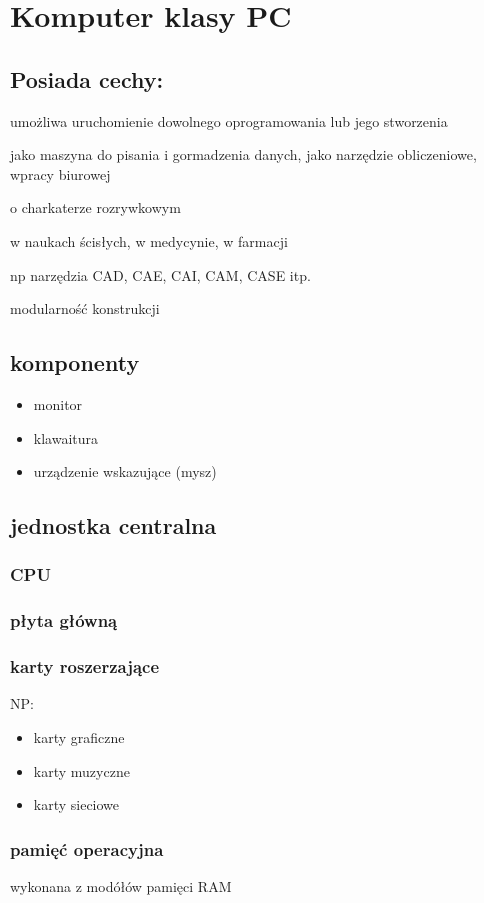 \documentclass[11pt]{article}
\begin{document}
\section{Komputer klasy PC}
\label{sec:org213ab8e}
\subsection{Posiada cechy:}
\label{sec:org7598b9a}
\begin{description}
\item[{porgramowalność}] umożliwa uruchomienie dowolnego oprogramowania lub jego stworzenia
\item[{uniwersalne zastosowania}] \begin{description}
\item[{typowo użytkowe}] jako maszyna do pisania i gormadzenia danych, jako narzędzie obliczeniowe, wpracy biurowej
\item o charkaterze rozrywkowym
\item[{badawczo-naukowe}] w naukach ścisłych, w medycynie, w farmacji
\item[{wspomagające projektowanie}] np narzędzia CAD, CAE, CAI, CAM, CASE itp.
\end{description}
\item modularność konstrukcji
\end{description}
\subsection{komponenty}
\label{sec:orgb96e9f0}
\begin{itemize}
\item monitor
\item klawaitura
\item urządzenie wskazujące (mysz)
\end{itemize}
\subsection{jednostka centralna}
\label{sec:orge8fe655}
\subsubsection{CPU}
\label{sec:orgf600a5a}
\subsubsection{płyta główną}
\label{sec:org3808370}
\subsubsection{karty roszerzające}
\label{sec:org66c3f1a}
NP:
\begin{itemize}
\item karty graficzne
\item karty muzyczne
\item karty sieciowe
\end{itemize}
\subsubsection{pamięć operacyjna}
\label{sec:org5131196}
wykonana z modółów pamięci RAM
\end{document}
